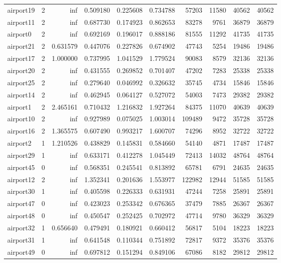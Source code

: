 \begin{longtable}{|l|r|r|r|r|r|r|r|r|r|}
airport19 & 2 & inf & 0.509180 & 0.225608 & 0.734788 & 57203 & 11580 & 40562 & 40562 \\
airport11 & 2 & inf & 0.687730 & 0.174923 & 0.862653 & 83278 & 9761 & 36879 & 36879 \\
airport0 & 2 & inf & 0.692169 & 0.196017 & 0.888186 & 81555 & 11292 & 41735 & 41735 \\
airport21 & 2 & 0.631579 & 0.447076 & 0.227826 & 0.674902 & 47743 & 5254 & 19486 & 19486 \\
airport17 & 2 & 1.000000 & 0.737995 & 1.041529 & 1.779524 & 90083 & 8579 & 32136 & 32136 \\
airport20 & 2 & inf & 0.431555 & 0.269852 & 0.701407 & 47202 & 7283 & 25338 & 25338 \\
airport25 & 2 & inf & 0.279640 & 0.046992 & 0.326632 & 35745 & 4734 & 15846 & 15846 \\
airport14 & 2 & inf & 0.462945 & 0.064127 & 0.527072 & 54003 & 7473 & 29382 & 29382 \\
airport1 & 2 & 2.465161 & 0.710432 & 1.216832 & 1.927264 & 84375 & 11070 & 40639 & 40639 \\
airport10 & 2 & inf & 0.927989 & 0.075025 & 1.003014 & 109489 & 9472 & 35728 & 35728 \\
airport16 & 2 & 1.365575 & 0.607490 & 0.993217 & 1.600707 & 74296 & 8952 & 32722 & 32722 \\
airport2 & 1 & 1.210526 & 0.438829 & 0.145831 & 0.584660 & 54140 & 4871 & 17487 & 17487 \\
airport29 & 1 & inf & 0.633171 & 0.412278 & 1.045449 & 72413 & 14032 & 48764 & 48764 \\
airport45 & 0 & inf & 0.568351 & 0.245541 & 0.813892 & 65781 & 6791 & 24635 & 24635 \\
airport12 & 2 & inf & 1.352341 & 0.201636 & 1.553977 & 122982 & 12944 & 51585 & 51585 \\
airport30 & 1 & inf & 0.405598 & 0.226333 & 0.631931 & 47244 & 7258 & 25891 & 25891 \\
airport47 & 0 & inf & 0.423023 & 0.253342 & 0.676365 & 37479 & 7885 & 26367 & 26367 \\
airport48 & 0 & inf & 0.450547 & 0.252425 & 0.702972 & 47714 & 9780 & 36329 & 36329 \\
airport32 & 1 & 0.656640 & 0.479491 & 0.180921 & 0.660412 & 56817 & 5104 & 18223 & 18223 \\
airport31 & 1 & inf & 0.641548 & 0.110344 & 0.751892 & 72817 & 9372 & 35376 & 35376 \\
airport49 & 0 & inf & 0.697812 & 0.151294 & 0.849106 & 67086 & 8182 & 29812 & 29812 \\

\end{longtable}
